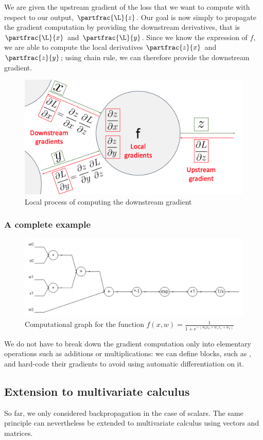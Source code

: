 We are given the upstream gradient of the loss that we want to compute with respect to our output, $\partfrac{\L}{z}$. Our goal is now simply to propagate the gradient computation by providing the downstream derivatives, that is $\partfrac{\L}{x}$ and $\partfrac{\L}{y}$. Since we know the expression of $f$, we are able to compute the local derivatives $\partfrac{z}{x}$ and $\partfrac{z}{y}$; using chain rule, we can therefore provide the downstream gradient.
\begin{figure}[H]
    \centering
    \includegraphics[width=.6\textwidth]{images/modularity.png}
    \caption{Local process of computing the downstream gradient}
\end{figure}

\subsubsection{A complete example}
\begin{figure}[H]
    \centering
    \includegraphics[width=.6\textwidth]{images/complete-example.png}
    \caption{Computational graph for the function $f(x, w) = \frac{1}{1+e^{-(w_0x_0+w_1x_1+w_2)}}$}
\end{figure}
We do not have to break down the gradient computation only into elementary operations such as additions or multiplications: we can define blocks, such as , and hard-code their gradients to avoid using automatic differentiation on it.

\subsection{Extension to multivariate calculus}
So far, we only considered backpropagation in the case of scalars. The same principle can nevertheless be extended to multivariate calculus using vectors and matrices.

